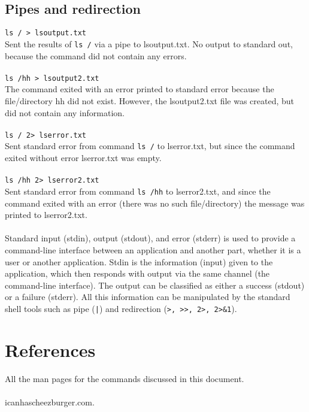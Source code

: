 \documentclass[a4paper,10pt]{article}
\begin{document}
\subsection{Pipes and redirection}
\verb!ls / > lsoutput.txt!
\\
Sent the results of \verb!ls /! via a pipe to lsoutput.txt. No output to standard out, because the command did not contain any errors.
\\
\\
\verb!ls /hh > lsoutput2.txt!
\\
The command exited with an error printed to standard error because the file/directory hh did not exist. However, the lsoutput2.txt file was created, but did not contain any information.
\\
\\
\verb!ls / 2> lserror.txt!
\\
Sent standard error from command \verb!ls /! to lserror.txt, but since the command exited without error lserror.txt was empty.
\\
\\
\verb!ls /hh 2> lserror2.txt!
\\
Sent standard error from command \verb!ls /hh! to lserror2.txt, and since the command exited with an error (there was no such file/directory) the message was printed to lserror2.txt.
\\
\\
Standard input (stdin), output (stdout), and error (stderr) is used to provide a command-line interface between an application and another part, whether it is a user or another application. Stdin is the information (input) given to the application, which then responds with output via the same channel (the command-line interface). The output can be classified as either a success (stdout) or a failure (stderr). All this information can be manipulated by the standard shell tools such as pipe (\verb!|!) and redirection (\verb!>, >>, 2>, 2>&1!).

\appendix
\section{References}
All the man pages for the commands discussed in this document.
\\
\\
icanhascheezburger.com.
\end{document}
